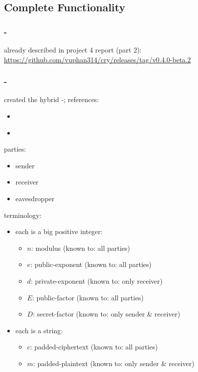 \subsection{Complete Functionality}


\subsubsection{\rsa-\cs}

already described in project 4 report (part 2):
\url{https://github.com/vuphan314/cry/releases/tag/v0.4.0-beta.2}


\subsubsection{\dummy-\cs}

\tc{} created the hybrid \dummy-\cs; references:
\begin{itemize}
\item \cite{Hybrid_cryptosystem}
\item \cite{RSA}
\end{itemize}

parties:
\begin{itemize}
\item sender
\item receiver
\item eavesdropper
\end{itemize}

terminology:
\begin{itemize}
\item each  is a big positive integer:
  \begin{itemize}
  \item $n$: modulus (known to: all parties)
  \item $e$: public-exponent (known to: all parties)
  \item $d$: private-exponent (known to: only receiver)
  \item $E$: public-factor (known to: all parties)
  \item $D$: secret-factor
    (known to: only sender \& receiver)
  \end{itemize}
\item each  is a string:
  \begin{itemize}
  \item $c$: padded-ciphertext (known to: all parties)
  \item $m$: padded-plaintext
    (known to: only sender \& receiver)
  \end{itemize}
\end{itemize}

